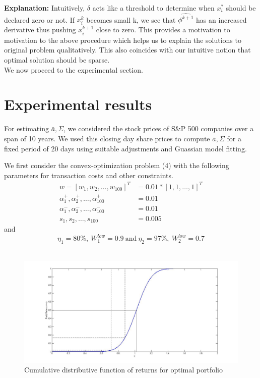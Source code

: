 \documentclass[a4paper]{article}
\begin{document}
\textbf{Explanation:} Intuitively, $\delta$ acts like a threshold to determine when $x_i^*$ should be declared zero or not. If $x_i^k$ becomes small k, we see that $\hat{\phi^{k+1}}$ has an increased derivative thus pushing $x_i^{k+1}$ close to zero. This provides a motivation to motivation to the above procedure which helps us to explain the solutions to original problem qualitatively. This also coincides with our intuitive notion that optimal solution should be sparse.\\[0.2em]

We now proceed to the experimental section.

\section{Experimental results}

For estimating $\bar{a},\Sigma$, we considered the stock prices of S\&P 500 companies over a span of 10 years. We used this closing day share prices to compute $\bar{a},\Sigma$ for a fixed period of 20 days using suitable adjustments and Guassian model fitting. 


We first consider the convex-optimization problem (4) with the following parameters for transaction costs and other constraints.
\begin{align*}
w=[w_1,w_2,\ldots,w_{100}]^T&=0.01*[1,1,\ldots,1]^T\\
\alpha_1^+,\alpha_2^+,\ldots,\alpha_{100}^+ &=0.01\\
\alpha_1^-,\alpha_2^-,\ldots,\alpha_{100}^- &= 0.01\\
s_1,s_2,\ldots,s_{100} &=0.005
\end{align*}
and
$$ \eta_1 = 80 \%,\  W_1^{low}=0.9 \  \text{and} \ \eta_2 = 97\%,\  W_2^{low} =0.7$$
\\
\begin{figure}[h]
\centering
\includegraphics[scale=0.4]{kaavali.jpg}
\caption{Cumulative distributive function of returns for optimal portfolio}
\label{fig:1}
\end{figure}
\end{document}
